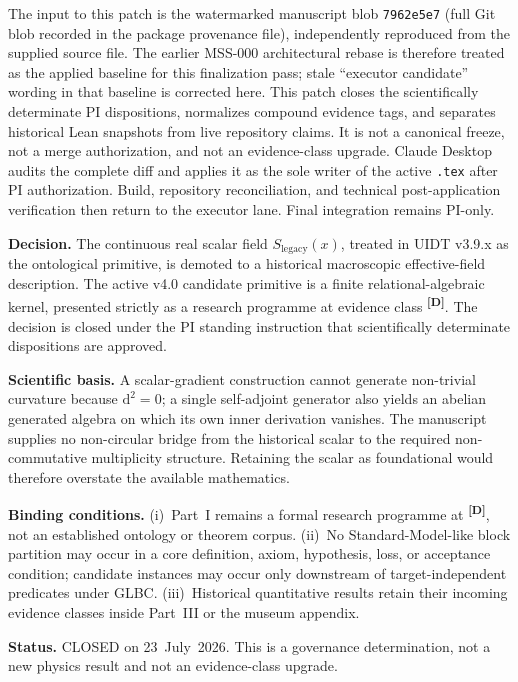 \documentclass[12pt,a4paper,twoside]{article}
\theoremstyle{plain}
\theoremstyle{definition}
\theoremstyle{remark}
\newcommand{\catmark}[1]{\textsuperscript{\textsf{\textbf{[#1]}}}}
\newcommand{\LegacySx}{S_{\mathrm{legacy}}(x)} %
\newcommand{\Sx}{\LegacySx} %
\begin{document}
\thispagestyle{uidtontology}

\begin{governancebox}
The input to this patch is the watermarked manuscript blob
\texttt{7962e5e7} (full Git blob recorded in the package provenance file),
independently reproduced from the supplied source file. The earlier MSS-000 architectural rebase is
therefore treated as the applied baseline for this finalization pass; stale
``executor candidate'' wording in that baseline is corrected here. This
patch closes the scientifically determinate PI dispositions, normalizes
compound evidence tags, and separates historical Lean snapshots from live
repository claims. It is not a canonical freeze, not a merge authorization,
and not an evidence-class upgrade. Claude Desktop audits the complete diff
and applies it as the sole writer of the active \texttt{.tex} after PI
authorization. Build, repository reconciliation, and technical
post-application verification then return to the executor lane. Final
integration remains PI-only.
\end{governancebox}

\begin{pioverridebox}
\label{box:pi-decision-d19}
\textbf{Decision.} The continuous real scalar field $\Sx$, treated in UIDT
v3.9.x as the ontological primitive, is demoted to a historical macroscopic
effective-field description. The active v4.0 candidate primitive is a finite
relational-algebraic kernel, presented strictly as a research programme at
evidence class \catmark{D}. The decision is closed under the PI standing
instruction that scientifically determinate dispositions are approved.

\textbf{Scientific basis.} A scalar-gradient construction cannot generate
non-trivial curvature because $\mathrm d^2=0$; a single self-adjoint generator
also yields an abelian generated algebra on which its own inner derivation
vanishes. The manuscript supplies no non-circular bridge from the historical
scalar to the required non-commutative multiplicity structure. Retaining the
scalar as foundational would therefore overstate the available mathematics.

\textbf{Binding conditions.}
(i)~Part~I remains a formal research programme at \catmark{D}, not an
established ontology or theorem corpus.
(ii)~No Standard-Model-like block partition may occur in a core definition,
axiom, hypothesis, loss, or acceptance condition; candidate instances may
occur only downstream of target-independent predicates under GLBC.
(iii)~Historical quantitative results retain their incoming evidence classes
inside Part~III or the museum appendix.

\textbf{Status.} CLOSED on 23~July~2026. This is a governance determination,
not a new physics result and not an evidence-class upgrade.
\end{pioverridebox}
\end{document}
